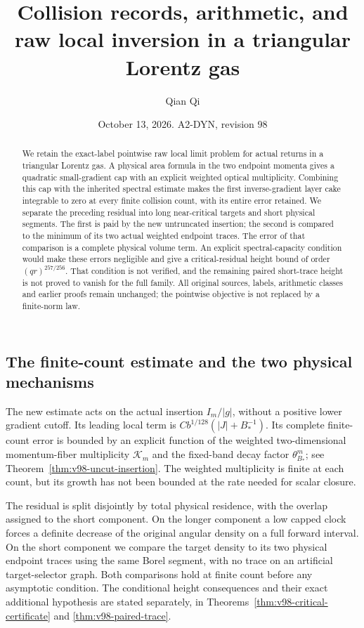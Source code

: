 \documentclass[11pt,reqno]{amsart}
\title[Collision records and raw local inversion]{Collision records, arithmetic, and raw local inversion in a triangular Lorentz gas}
\author{Qian Qi}
\date{October 13, 2026. A2-DYN, revision 98}
\numberwithin{equation}{section}
\theoremstyle{definition}
\theoremstyle{remark}\newtheorem{remark}[theorem]{Remark}
\begin{document}
\raggedbottom
\begin{abstract}
We retain the exact-label pointwise raw local limit problem for actual
returns in a triangular Lorentz gas. A physical area formula in the two
endpoint momenta gives a quadratic small-gradient cap with an explicit
weighted optical multiplicity. Combining this cap with the inherited
spectral estimate makes the first inverse-gradient layer cake integrable
to zero at every finite collision count, with its entire error retained.
We separate the preceding residual into long near-critical targets and
short physical segments. The first is paid by the new untruncated
insertion; the second is compared to the minimum of its two actual
weighted endpoint traces. The error of that comparison is a complete
physical volume term. An explicit spectral-capacity condition would
make these errors negligible and give a critical-residual height bound
of order $(qr)^{257/256}$. That condition is not verified, and the remaining paired short-trace
height is not proved to vanish for the full family. All
original sources, labels, arithmetic classes and earlier proofs remain
unchanged; the pointwise objective is not replaced by a finite-norm law.
\end{abstract}
\maketitle


\subsection{The finite-count estimate and the two physical mechanisms}
The new estimate acts on the actual insertion $I_m/|g|$, without a
positive lower gradient cutoff. Its leading local term is
$C b^{1/128}(|J|+B_*^{-1})$. Its complete finite-count error is
bounded by an explicit function of the weighted two-dimensional
momentum-fiber multiplicity $\mathcal K_m$ and the fixed-band decay
factor $\theta_{B_*}^m$; see Theorem~\ref{thm:v98-uncut-insertion}.
The weighted multiplicity is finite at each count, but its growth has
not been bounded at the rate needed for scalar closure.

The residual is split disjointly by total physical residence, with the
overlap assigned to the short component. On the longer component a
low capped clock forces a definite decrease of the original angular
density on a full forward interval. On the short component we compare
the target density to its two physical endpoint traces using the same
Borel segment, with no trace on an artificial target-selector graph.
Both comparisons hold at finite count before any asymptotic condition.
The conditional height consequences and their exact additional
hypothesis are stated separately, in Theorems~\ref{thm:v98-critical-certificate}
and \ref{thm:v98-paired-trace}.







\appendix


\end{document}
